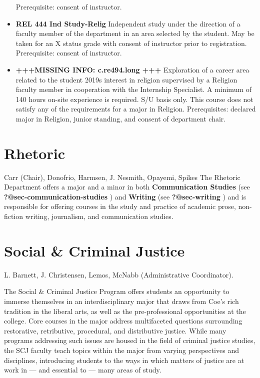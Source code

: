 \documentclass[
  letterpaper,
]{scrbook}
\begin{document}
\begin{itemize}
  Prerequisite: consent of instructor.
\item
  \textbf{REL 444 Ind Study-Relig} Independent study under the direction
  of a faculty member of the department in an area selected by the
  student. May be taken for an X status grade with consent of instructor
  prior to registration. Prerequisite: consent of instructor.
\item
  \textbf{+++MISSING INFO: c.re494.long +++} Exploration of a career
  area related to the student 2019s interest in religion supervised by a
  Religion faculty member in cooperation with the Internship Specialist.
  A minimum of 140 hours on-site experience is required. S/U basis only.
  This course does not satisfy any of the requirements for a major in
  Religion. Prerequisites: declared major in Religion, junior standing,
  and consent of department chair.
\end{itemize}

\hypertarget{rhetoric}{%
\section{Rhetoric}\label{rhetoric}}

Carr (Chair), Donofrio, Harmsen, J. Nesmith, Opayemi, Spikes The
Rhetoric Department offers a major and a minor in both
\textbf{Communication Studies} (see \textbf{?@sec-communication-studies}
) and \textbf{Writing} (see \textbf{?@sec-writing} ) and is responsible
for offering courses in the study and practice of academic prose,
non-fiction writing, journalism, and communication studies.

\hypertarget{social-criminal-justice}{%
\section{Social \& Criminal Justice}\label{social-criminal-justice}}

L. Barnett, J. Christensen, Lemos, McNabb (Administrative Coordinator).

The Social \& Criminal Justice Program offers students an opportunity to
immerse themselves in an interdisciplinary major that draws from Coe's
rich tradition in the liberal arts, as well as the pre-professional
opportunities at the college. Core courses in the major address
multifaceted questions surrounding restorative, retributive, procedural,
and distributive justice. While many programs addressing such issues are
housed in the field of criminal justice studies, the SCJ faculty teach
topics within the major from varying perspectives and disciplines,
introducing students to the ways in which matters of justice are at work
in --- and essential to --- many areas of study.
\end{document}
